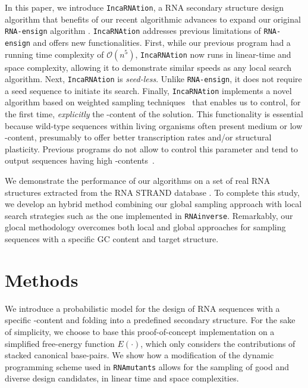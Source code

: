 \documentclass{bioinfo}
\newcommand{\RNAmutants}{\texttt{RNAmutants}\xspace}
\newcommand{\RNAinverse}{\texttt{RNAinverse}\xspace}
\newcommand{\RNAensign}{\texttt{RNA-ensign}\xspace}
\newcommand{\GCContent}{\Gb\Cb-content\xspace}
\newcommand{\ourprog}{\texttt{IncaRNAtion}\xspace}
\newcommand{\RNASTRAND}{{\sf RNA STRAND}\xspace}
\newcommand{\Cb}{{\sf{C}}\xspace}
\newcommand{\Gb}{{\sf{G}}\xspace}
\newcommand{\ES}{{{E}}}
\begin{document}
In this paper, we introduce \ourprog, a RNA secondary structure design algorithm that benefits of our recent algorithmic advances \citep{Reinharz:2013aa} to expand our original \RNAensign algorithm \citep{Levin:2012kx}. \ourprog addresses previous limitations of \RNAensign and offers new functionalities. First, while our previous program had a running time complexity of $\mathcal{O}(n^5)$, \ourprog now runs in linear-time and space complexity, allowing it to demonstrate similar speeds as any local search algorithm. Next, \ourprog is \textit{seed-less}. Unlike \RNAensign, it does not require a seed sequence to initiate its search. Finally, \ourprog implements a novel algorithm based on weighted sampling techniques~\citep{Bodini2010} that enables us to control, for the first time, \textit{explicitly} the \GCContent of the solution. This functionality is essential because wild-type sequences within living organisms often present medium or low \GCContent, presumably to offer better transcription rates and/or structural plasticity. Previous programs do not allow to control this parameter and tend to output sequences having high \GCContent{}s~\citep{Lyngso:2012vn}. 

We demonstrate the performance of our algorithms on a set of real RNA structures extracted from the \RNASTRAND database \citep{andronescu2008rna}. To complete this study, we develop an hybrid method combining our global sampling approach with local search strategies such as the one implemented in \RNAinverse.  Remarkably, our glocal methodology overcomes both local and global approaches  for sampling sequences with a specific GC content and target structure.

\section{Methods}
\label{sec:methods}



We introduce a probabilistic model for the design of RNA sequences with a specific \GCContent and folding into a predefined secondary structure.
For the sake of simplicity, we choose to base this proof-of-concept implementation on a simplified free-energy function $\ES(\cdot)$, which only considers the contributions of 
stacked canonical base-pairs. We show how a modification of the dynamic programming scheme used in \RNAmutants allows for the sampling of good and diverse design candidates, in linear time and space complexities.
\end{document}
